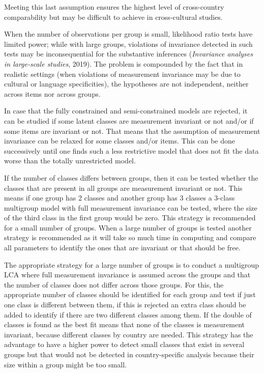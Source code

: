 \documentclass[12pt,a4paper,oneside]{reedthesis}
\begin{document}
Meeting this last assumption ensures the highest level of cross-country comparability but may be difficult to achieve in cross-cultural studies.

When the number of observations per group is small, likelihood ratio tests have limited power; while with large groups, violations of invariance detected in such tests may be inconsequential for the substantive inferences (\emph{Invariance analyses in large-scale studies}, 2019). The problem is compounded by the fact that in realistic settings (when violations of measurement invariance may be due to cultural or language specificities), the hypotheses are not independent, neither across items nor across groups.

In case that the fully constrained and semi-constrained models are rejected, it can be studied if some latent classes are measurement invariant or not and/or if some items are invariant or not. That means that the assumption of measurement invariance can be relaxed for some classes and/or items. This can be done successively until one finds such a less restrictive model that does not fit the data worse than the totally unrestricted model.

If the number of classes differs between groups, then it can be tested whether the classes that are present in all groups are measurement invariant or not. This means if one group has 2 classes and another group has 3 classes a 3-class multigroup model with full measurement invariance can be tested, where the size of the third class in the first group would be zero. This strategy is recommended for a small number of groups. When a large number of groups is tested another strategy is recommended as it will take so much time in computing and compare all parameters to identify the ones that are invariant or that should be free.

The appropriate strategy for a large number of groups is to conduct a multigroup LCA where full measurement invariance is assumed across the groups and that the number of classes does not differ across those groups. For this, the appropriate number of classes should be identified for each group and test if just one class is different between them, if this is rejected an extra class should be added to identify if there are two different classes among them. If the double of classes is found as the best fit means that none of the classes is measurement invariant, because different classes by country are needed. This strategy has the advantage to have a higher power to detect small classes that exist in several groups but that would not be detected in country-specific analysis because their size within a group might be too small.
\end{document}
